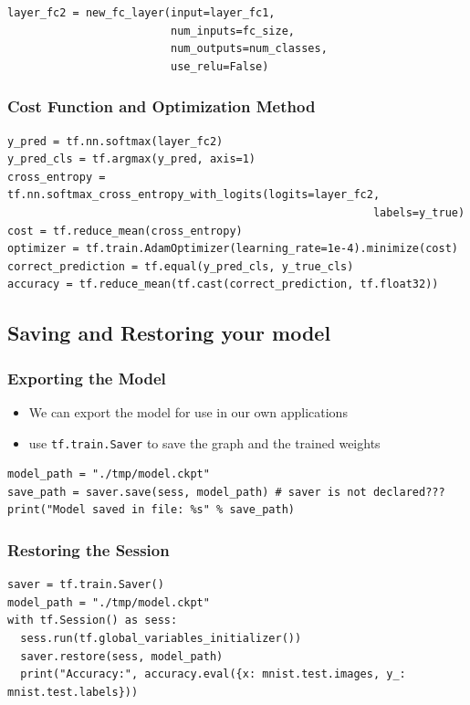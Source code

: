 \documentclass[11pt]{article}
\begin{document}
\begin{verbatim}
layer_fc2 = new_fc_layer(input=layer_fc1,
                         num_inputs=fc_size,
                         num_outputs=num_classes,
                         use_relu=False)
\end{verbatim}
\subsubsection*{Cost Function and Optimization Method}
\label{sec:orgd74cba9}

\begin{verbatim}
y_pred = tf.nn.softmax(layer_fc2)
y_pred_cls = tf.argmax(y_pred, axis=1)
cross_entropy = tf.nn.softmax_cross_entropy_with_logits(logits=layer_fc2,
                                                        labels=y_true)
cost = tf.reduce_mean(cross_entropy)
optimizer = tf.train.AdamOptimizer(learning_rate=1e-4).minimize(cost)
correct_prediction = tf.equal(y_pred_cls, y_true_cls)
accuracy = tf.reduce_mean(tf.cast(correct_prediction, tf.float32))
\end{verbatim}

\subsection*{Saving and Restoring your model}
\label{sec:org47b7e5f}
\subsubsection*{Exporting the Model}
\label{sec:orgeb0b80c}
\begin{itemize}
\item We can export the model for use in our own applications
\item use \texttt{tf.train.Saver} to save the graph and the trained weights
\end{itemize}
\begin{verbatim}
model_path = "./tmp/model.ckpt"
save_path = saver.save(sess, model_path) # saver is not declared???
print("Model saved in file: %s" % save_path)
\end{verbatim}

\subsubsection*{Restoring the Session}
\label{sec:org6026f43}
\begin{verbatim}
saver = tf.train.Saver()
model_path = "./tmp/model.ckpt"
with tf.Session() as sess:
  sess.run(tf.global_variables_initializer())
  saver.restore(sess, model_path)
  print("Accuracy:", accuracy.eval({x: mnist.test.images, y_: mnist.test.labels}))
\end{verbatim}
\end{document}
